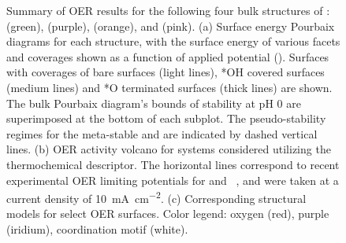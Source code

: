 \begin{figure}
\centering
{}
\caption{\label{fig:oer_volcano}
%
Summary of OER results for the following four bulk structures of \IrOx: \rIrOtwo (green), \aIrOthree (purple), \rIrOthree (orange), and \bIrOthree (pink).
%
(a) Surface energy Pourbaix diagrams for each structure, with the surface energy of various facets and coverages shown as a function of applied potential (\VRHE).
%
Surfaces with coverages of bare surfaces (light lines), *OH covered surfaces (medium lines) and *O terminated surfaces (thick lines) are shown.
%
The bulk Pourbaix diagram's bounds of stability at pH \num{0} are superimposed at the bottom of each subplot.
%
The pseudo-stability regimes for the meta-stable \bIrOthree and \rIrOthree are indicated by dashed vertical lines.
%
(b) OER activity volcano for \IrOx systems considered utilizing the \DGOmOH thermochemical descriptor.
%
The horizontal lines correspond to recent experimental OER limiting potentials for \IrOtwo and \IrOthree~\cite{Seitz2016}, and were taken at a current density of \SI[mode=text]{10}{\mA\per\cm\squared}.
%
(c) Corresponding structural models for select OER surfaces.
%
%
Color legend: oxygen (red), purple (iridium), coordination motif (white).
}
\end{figure}


